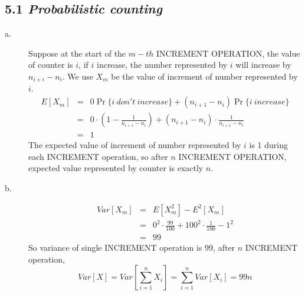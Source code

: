 \documentclass{article}
\begin{document}
\subsection*{5.1 \textit{Probabilistic counting}}
\begin{description}
\item[a.] Suppose at the start of the $m-th$ INCREMENT OPERATION, the value of counter is
$i$, if $i$ increase, the number represented by $i$ will increase by
$n_{i+i}-n_i$. We use $X_m$ be the value of increment of number represented by
$i$.
\begin{eqnarray*}
E[X_m] &=& 0\Pr\{i~don't~increase\} + (n_{i+1}-n_i)\Pr\{i~increase\}\\
       &=& 0\cdot(1-\frac{1}{n_{i+1}-n_i}) + (n_{i+1}-n_i)\cdot\frac{1}{n_{i+1}-n_i}\\
       &=& 1
\end{eqnarray*}
The expected value of increment of number represented by $i$ is 1 during each
INCREMENT operation, so after $n$ INCREMENT OPERATION, expected value
represented by counter is exactly $n$.

\item[b.] 
  \begin{eqnarray*}
    Var[X_m] &=& E[X_m^2] - E^2[X_m]\\
             &=& 0^2\cdot\frac{99}{100}+100^2\cdot\frac{1}{100} - 1^2\\
             &=& 99
  \end{eqnarray*}
So variance of single INCREMENT operation is 99, after $n$ INCREMENT operation, 
\[Var[X] = Var[\sum_{i = 1}^nX_i] = \sum_{i = 1}^nVar[X_i] = 99n\]
\end{description}
\end{document}
